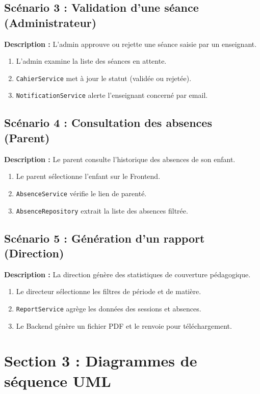 \documentclass[12pt,a4paper]{article}
\begin{document}
\subsection{Scénario 3 : Validation d’une séance (Administrateur)}
\textbf{Description :} L'admin approuve ou rejette une séance saisie par un enseignant.
\begin{enumerate}
    \item L'admin examine la liste des séances en attente.
    \item \texttt{CahierService} met à jour le statut (validée ou rejetée).
    \item \texttt{NotificationService} alerte l'enseignant concerné par email.
\end{enumerate}

\subsection{Scénario 4 : Consultation des absences (Parent)}
\textbf{Description :} Le parent consulte l'historique des absences de son enfant.
\begin{enumerate}
    \item Le parent sélectionne l'enfant sur le Frontend.
    \item \texttt{AbsenceService} vérifie le lien de parenté.
    \item \texttt{AbsenceRepository} extrait la liste des absences filtrée.
\end{enumerate}

\subsection{Scénario 5 : Génération d’un rapport (Direction)}
\textbf{Description :} La direction génère des statistiques de couverture pédagogique.
\begin{enumerate}
    \item Le directeur sélectionne les filtres de période et de matière.
    \item \texttt{ReportService} agrège les données des sessions et absences.
    \item Le Backend génère un fichier PDF et le renvoie pour téléchargement.
\end{enumerate}

\newpage
\section{Section 3 : Diagrammes de séquence UML}
\end{document}
